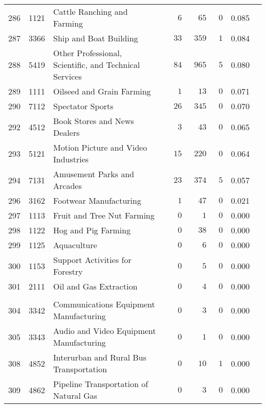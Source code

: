 \documentclass[9pt, oneside]{article}   	%
\begin{document}
\begin{longtable}{lcp{3 in}ccccc}
286  & 1121 & Cattle Ranching and Farming & $\phantom{000}6$ & $\phantom{00}65$ & $\phantom{0}0$ & 0.085 \\
287  & 3366 & Ship and Boat Building & $\phantom{00}33$ & $\phantom{0}359$ & $\phantom{0}1$ & 0.084 \\
288  & 5419 & Other Professional, Scientific, and Technical Services & $\phantom{00}84$ & $\phantom{0}965$ & $\phantom{0}5$ & 0.080 \\
289  & 1111 & Oilseed and Grain Farming & $\phantom{000}1$ & $\phantom{00}13$ & $\phantom{0}0$ & 0.071 \\
290  & 7112 & Spectator Sports & $\phantom{00}26$ & $\phantom{0}345$ & $\phantom{0}0$ & 0.070 \\

292  & 4512 & Book Stores and News Dealers & $\phantom{000}3$ & $\phantom{00}43$ & $\phantom{0}0$ & 0.065 \\
293  & 5121 & Motion Picture and Video Industries & $\phantom{00}15$ & $\phantom{0}220$ & $\phantom{0}0$ & 0.064 \\
294  & 7131 & Amusement Parks and Arcades & $\phantom{00}23$ & $\phantom{0}374$ & $\phantom{0}5$ & 0.057 \\

296  & 3162 & Footwear Manufacturing & $\phantom{000}1$ & $\phantom{00}47$ & $\phantom{0}0$ & 0.021 \\
297  & 1113 & Fruit and Tree Nut Farming & $\phantom{000}0$ & $\phantom{000}1$ & $\phantom{0}0$ & 0.000 \\
298  & 1122 & Hog and Pig Farming & $\phantom{000}0$ & $\phantom{00}38$ & $\phantom{0}0$ & 0.000 \\
299  & 1125 & Aquaculture & $\phantom{000}0$ & $\phantom{000}6$ & $\phantom{0}0$ & 0.000 \\
300  & 1153 & Support Activities for Forestry & $\phantom{000}0$ & $\phantom{000}5$ & $\phantom{0}0$ & 0.000 \\
301  & 2111 & Oil and Gas Extraction & $\phantom{000}0$ & $\phantom{000}4$ & $\phantom{0}0$ & 0.000 \\
 \\
304  & 3342 & Communications Equipment Manufacturing & $\phantom{000}0$ & $\phantom{000}3$ & $\phantom{0}0$ & 0.000 \\
305  & 3343 & Audio and Video Equipment Manufacturing & $\phantom{000}0$ & $\phantom{000}1$ & $\phantom{0}0$ & 0.000 \\

308  & 4852 & Interurban and Rural Bus Transportation & $\phantom{000}0$ & $\phantom{00}10$ & $\phantom{0}1$ & 0.000 \\
309  & 4862 & Pipeline Transportation of Natural Gas & $\phantom{000}0$ & $\phantom{000}3$ & $\phantom{0}0$ & 0.000 \\


\end{longtable}
\end{document}
